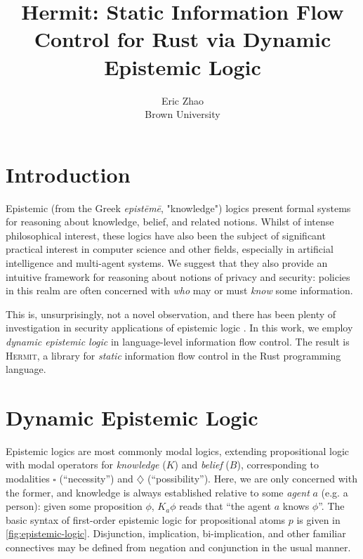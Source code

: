 \documentclass[letterpaper,twocolumn,10pt]{article}
\newcommand{\Hermit}{\textsc{Hermit}}
\begin{document}
\ActivateVerbatimLigatures

\date{}

\title{\Large \bf Hermit: Static Information Flow Control for Rust via Dynamic Epistemic Logic}

\author{
  {\rm Eric Zhao} \\
  Brown University
}

\maketitle

\section{Introduction}

Epistemic (from the Greek \emph{epistēmē}, "knowledge") logics present formal systems for reasoning about knowledge,
belief, and related notions. Whilst of intense philosophical interest, these logics have also been
the subject of significant practical interest in computer science and other fields, especially in
artificial intelligence and multi-agent systems. We suggest that they also provide an intuitive
framework for reasoning about notions of privacy and security: policies in this realm are often
concerned with \emph{who} may or must \emph{know} some information.

This is, unsurprisingly, not a novel observation, and there has been plenty of investigation in
security applications of epistemic logic \cite{aucher_2011a, dechesne_2010a, balliu_2011a,
koleini_2013a, soloviev_2024a}. In this work, we employ \emph{dynamic epistemic logic} in
language-level information flow control. The result is \Hermit{}, a library for \emph{static}
information flow control in the Rust programming language.

\section{Dynamic Epistemic Logic}
\label{sec:background-del}

Epistemic logics are most commonly modal logics, extending propositional logic with modal operators
for \emph{knowledge} (\(K\)) and \emph{belief} (\(B\)), corresponding to modalities \(\square\)
(``necessity'') and \(\diamondsuit\) (``possibility''). Here, we are only concerned with the former,
and knowledge is always established relative to some \emph{agent} \(a\) (e.g. a person): given some
proposition \(\phi\), \(K_a \phi\) reads that ``the agent \(a\) knows \(\phi\)''. The basic syntax
of first-order epistemic logic for propositional atoms \(p\) is given in \cref{fig:epistemic-logic}.
Disjunction, implication, bi-implication, and other familiar connectives may be defined from
negation and conjunction in the usual manner.
\end{document}
